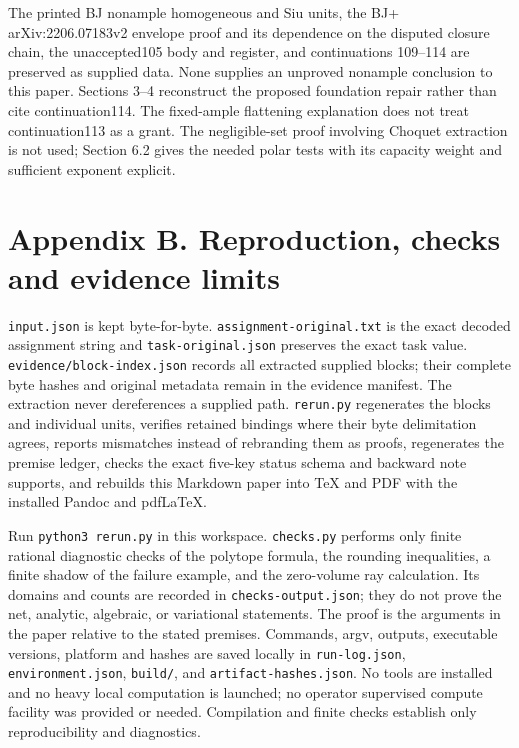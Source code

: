\documentclass[
  10pt,
]{article}
\begin{document}
The printed BJ nonample homogeneous and Siu units, the BJ+
arXiv:2206.07183v2 envelope proof and its dependence on the disputed
closure chain, the unaccepted105 body and register, and continuations
109--114 are preserved as supplied data. None supplies an unproved
nonample conclusion to this paper. Sections 3--4 reconstruct the
proposed foundation repair rather than cite continuation114. The
fixed-ample flattening explanation does not treat continuation113 as a
grant. The negligible-set proof involving Choquet extraction is not
used; Section 6.2 gives the needed polar tests with its capacity weight
and sufficient exponent explicit.

\section{Appendix B. Reproduction, checks and evidence
limits}\label{appendix-b.-reproduction-checks-and-evidence-limits}

\texttt{input.json} is kept byte-for-byte.
\texttt{assignment-original.txt} is the exact decoded assignment string
and \texttt{task-original.json} preserves the exact task value.
\texttt{evidence/block-index.json} records all extracted supplied
blocks; their complete byte hashes and original metadata remain in the
evidence manifest. The extraction never dereferences a supplied path.
\texttt{rerun.py} regenerates the blocks and individual units, verifies
retained bindings where their byte delimitation agrees, reports
mismatches instead of rebranding them as proofs, regenerates the premise
ledger, checks the exact five-key status schema and backward note
supports, and rebuilds this Markdown paper into TeX and PDF with the
installed Pandoc and pdfLaTeX.

Run \texttt{python3\ rerun.py} in this workspace. \texttt{checks.py}
performs only finite rational diagnostic checks of the polytope formula,
the rounding inequalities, a finite shadow of the failure example, and
the zero-volume ray calculation. Its domains and counts are recorded in
\texttt{checks-output.json}; they do not prove the net, analytic,
algebraic, or variational statements. The proof is the arguments in the
paper relative to the stated premises. Commands, argv, outputs,
executable versions, platform and hashes are saved locally in
\texttt{run-log.json}, \texttt{environment.json}, \texttt{build/}, and
\texttt{artifact-hashes.json}. No tools are installed and no heavy local
computation is launched; no operator supervised compute facility was
provided or needed. Compilation and finite checks establish only
reproducibility and diagnostics.
\end{document}
